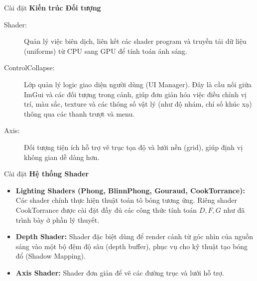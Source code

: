 \documentclass[11pt, aspectratio=169]{beamer}
\begin{document}
\begin{frame}{Cài đặt}
	\textbf{Kiến trúc Đối tượng}
	\begin{description}
		\item[Shader:] Quản lý việc biên dịch, liên kết các shader program và truyền tải dữ liệu (uniforms) từ CPU sang GPU để tính toán ánh sáng.
		\item[ControlCollapse:] Lớp quản lý logic giao diện người dùng (UI Manager). Đây là cầu nối giữa ImGui và các đối tượng trong cảnh, giúp đơn giản hóa việc điều chỉnh vị trí, màu sắc, texture và các thông số vật lý (như độ nhám, chỉ số khúc xạ) thông qua các thanh trượt và menu.
		\item[Axis:] Đối tượng tiện ích hỗ trợ vẽ trục tọa độ và lưới nền (grid), giúp định vị không gian dễ dàng hơn.
	\end{description}
\end{frame}

\begin{frame}{Cài đặt}
	\textbf{Hệ thống Shader}
	\begin{itemize}
		\item \textbf{Lighting Shaders (Phong, BlinnPhong, Gouraud, CookTorrance):} Các shader chính thực hiện thuật toán tô bóng tương ứng. Riêng shader CookTorrance được cài đặt đầy đủ các công thức tính toán $D, F, G$ như đã trình bày ở phần lý thuyết.
		
		\item \textbf{Depth Shader:} Shader đặc biệt dùng để render cảnh từ góc nhìn của nguồn sáng vào một bộ đệm độ sâu (depth buffer), phục vụ cho kỹ thuật tạo bóng đổ (Shadow Mapping).
		
		\item \textbf{Axis Shader:} Shader đơn giản để vẽ các đường trục và lưới hỗ trợ.
	\end{itemize}
\end{frame}
\end{document}
